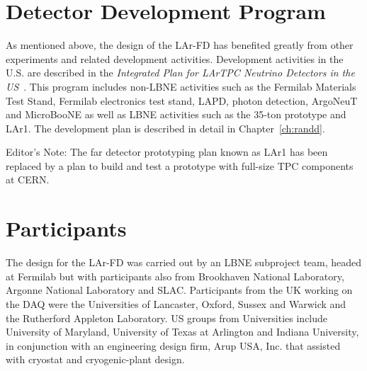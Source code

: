 \section{Detector Development Program}


As mentioned above, the design of the LAr-FD has benefited greatly
from other experiments and related development activities. Development
activities in the U.S. are described in the {\em Integrated Plan for
LArTPC Neutrino Detectors in the US}~\cite{IP}. This program
includes non-LBNE activities such as the Fermilab Materials Test
Stand, Fermilab electronics test stand, LAPD, photon detection,
ArgoNeuT and MicroBooNE as well as LBNE activities such as the 35-ton
prototype and LAr1. The development plan is described in detail in
Chapter~\ref{ch:randd}.


\begin{editornote}
  Editor's Note: The far detector prototyping plan known as LAr1 has been replaced by a plan to build and test a prototype with full-size TPC components at CERN.
\end{editornote}


\section{Participants}


The design for the LAr-FD was carried out by an LBNE subproject team, headed at Fermilab  but with participants also from Brookhaven National Laboratory, Argonne National Laboratory
 and SLAC.  Participants from the UK working on the DAQ were the Universities of Lancaster, Oxford, Sussex and Warwick and the Rutherford Appleton Laboratory.  US groups from Universities include University of Maryland, University of Texas at Arlington
and Indiana University, in conjunction with an engineering design firm, Arup USA, Inc. that assisted with cryostat and cryogenic-plant design. 


